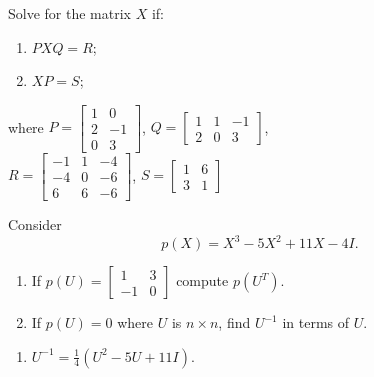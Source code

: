 \documentclass{ximera}
\begin{document}
\begin{problem}\label{prob:4.75}
Solve for the matrix $X$ if:
\begin{enumerate}
\item $PXQ = R$;
\item $XP = S$;
\end{enumerate}
where
$
P = \left[ \begin{array}{rr}
1 & 0 \\
2 & -1 \\
0 & 3
\end{array} \right]$, $
Q = \left[ \begin{array}{rrr}
1 & 1 & -1 \\
2 & 0 & 3
\end{array} \right]$, \\ $
R = \left[ \begin{array}{rrr}
-1 & 1 & -4 \\
-4 & 0 & -6 \\
6 & 6 & -6
\end{array} \right]$, $
S = \left[ \begin{array}{rr}
1 & 6\\
3 & 1
\end{array} \right]$
\end{problem}

\begin{problem}\label{prob:4.76}
Consider \begin{equation*}
p(X) = X^{3} - 5X^{2} + 11X - 4I.
\end{equation*}


\begin{enumerate}[label={\alph*.}]
\item If $p(U) = \left[ \begin{array}{rr}
1 & 3 \\
-1 & 0
\end{array} \right]$
 compute $p(U^{T})$.

\item If $p(U) = 0$ where $U$ is $n \times n$, find $U^{-1}$ in terms of $U$.

\end{enumerate}
\begin{hint}
\begin{enumerate}
\item  $U^{-1} = \frac{1}{4}(U^{2} - 5U + 11I)$.

\end{enumerate}
\end{hint}
\end{problem}
\end{document}
